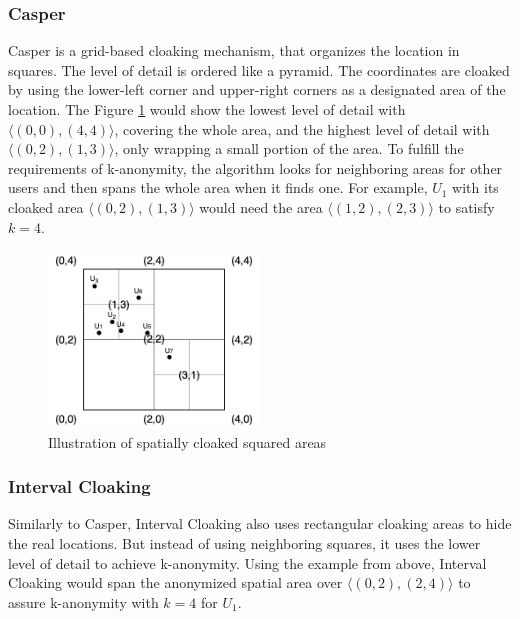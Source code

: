\subsubsection{Casper}
Casper
is a grid-based cloaking mechanism, that organizes the location in squares. The level of detail is ordered like a pyramid. The coordinates are cloaked by using the lower-left corner and upper-right corners as a designated area of the location.
The Figure \ref{fig:casper} would show the lowest level of detail with \(\langle(0,0),(4,4)\rangle\), covering the whole area, and the highest level of detail with \(\langle(0,2),(1,3)\rangle\), only wrapping a small portion of the area. To fulfill the requirements of k-anonymity, the algorithm looks for neighboring areas for other users and then spans the whole area when it finds one. For example, \(U_1\) with its cloaked area \(\langle(0,2),(1,3)\rangle\) would need the area \(\langle(1,2),(2,3)\rangle\) to satisfy \(k=4\).

\begin{figure}[htpb]
  \centering
  \includegraphics[width=0.5\textwidth]{figures/casper.png}
  \caption{Illustration of spatially cloaked squared areas} \label{fig:casper}
\end{figure}

\subsubsection{Interval Cloaking}
Similarly to Casper, Interval Cloaking also uses rectangular cloaking areas to hide the real locations. But instead of using neighboring squares, it uses the lower level of detail to achieve k-anonymity. Using the example from above, Interval Cloaking would span the anonymized spatial area over \(\langle(0,2),(2,4)\rangle\) to assure k-anonymity with \(k=4\) for \(U_1\).

